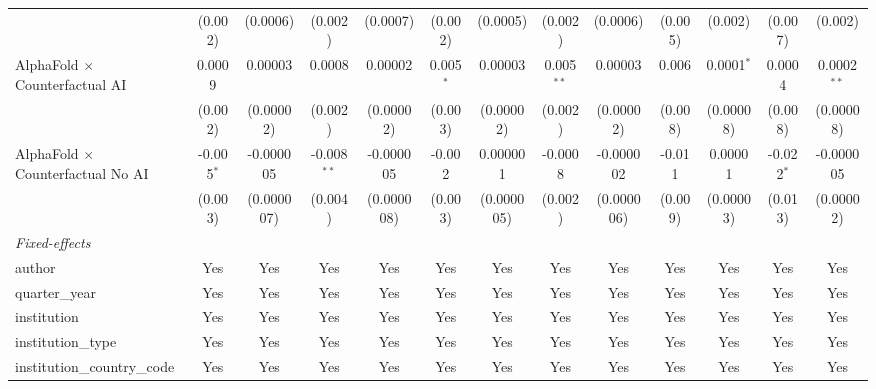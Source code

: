 \begin{tabular}{lcccccccccccc}
                                            & (0.002)       & (0.0006)       & (0.002)        & (0.0007)       & (0.002)       & (0.0005)       & (0.002)        & (0.0006)       & (0.005) & (0.002)      & (0.007)      & (0.002)\\   
   AlphaFold $\times$ Counterfactual AI     & 0.0009        & 0.00003        & 0.0008         & 0.00002        & 0.005$^{*}$   & 0.00003        & 0.005$^{**}$   & 0.00003        & 0.006   & 0.0001$^{*}$ & 0.0004       & 0.0002$^{**}$\\   
                                            & (0.002)       & (0.00002)      & (0.002)        & (0.00002)      & (0.003)       & (0.00002)      & (0.002)        & (0.00002)      & (0.008) & (0.00008)    & (0.008)      & (0.00008)\\   
   AlphaFold $\times$ Counterfactual No AI  & -0.005$^{*}$  & -0.000005      & -0.008$^{**}$  & -0.000005      & -0.002        & 0.000001       & -0.0008        & -0.000002      & -0.011  & 0.00001      & -0.022$^{*}$ & -0.000005\\   
                                            & (0.003)       & (0.000007)     & (0.004)        & (0.000008)     & (0.003)       & (0.000005)     & (0.002)        & (0.000006)     & (0.009) & (0.00003)    & (0.013)      & (0.00002)\\   
   \midrule
   \emph{Fixed-effects}\\
   author                                   & Yes           & Yes            & Yes            & Yes            & Yes           & Yes            & Yes            & Yes            & Yes     & Yes          & Yes          & Yes\\  
   quarter\_year                            & Yes           & Yes            & Yes            & Yes            & Yes           & Yes            & Yes            & Yes            & Yes     & Yes          & Yes          & Yes\\  
   institution                              & Yes           & Yes            & Yes            & Yes            & Yes           & Yes            & Yes            & Yes            & Yes     & Yes          & Yes          & Yes\\  
   institution\_type                        & Yes           & Yes            & Yes            & Yes            & Yes           & Yes            & Yes            & Yes            & Yes     & Yes          & Yes          & Yes\\  
   institution\_country\_code               & Yes           & Yes            & Yes            & Yes            & Yes           & Yes            & Yes            & Yes            & Yes     & Yes          & Yes          & Yes\\  

\end{tabular}
